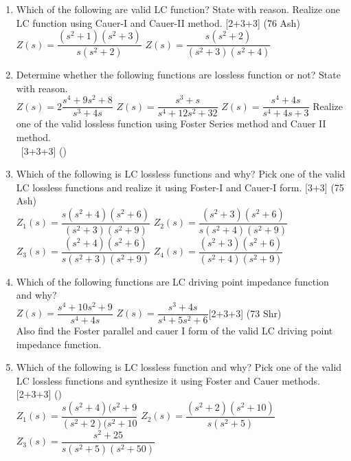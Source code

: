 \documentclass[12pt]{article}
\newcommand{\enter}{\\\textcolor{white}{1}}
\begin{document}
\begin{enumerate}
				\item Which of the following are valid LC function? State with reason. Realize one LC function using Cauer-I and Cauer-II method. \hfill [2+3+3] (76 Ash)\\
				$Z(s) = \dfrac{(s^2+1)(s^2+3)}{s(s^2+2)}$ \hspace{2cm}
				$Z(s) = \dfrac{s(s^2+2)}{(s^2+3)(s^2+4)}$
				
				\item Determine whether the following functions are lossless function or not? State with reason. \\
				$Z(s) = 2\dfrac{s^4+9s^2+8}{s^3+4s}$ \hspace{2cm}
				$Z(s) = \dfrac{s^3+s}{s^4+12s^2+32}$ \hspace{2cm}
				$Z(s) = \dfrac{s^4+4s}{s^4+4s+3}$
				Realize one of the valid lossless function using Foster Series method and Cauer II method.
				\enter\hfill [3+3+3] ()
				
				\item Which of the following is LC lossless functions and why? Pick one of the valid LC lossless functions and realize it using Foster-I and Cauer-I form. \hfill [3+3] (75 Ash)\\
				$Z_1(s) = \dfrac{s(s^2+4)(s^2+6)}{(s^2+3)(s^2+9)}$ \hspace{2cm}
				$Z_2(s) = \dfrac{(s^2+3)(s^2+6)}{s(s^2+4)(s^2+9)}$ \\
				$Z_3(s) = \dfrac{(s^2+4)(s^2+6)}{s(s^2+3)(s^2+9)}$ \hspace{2cm}
				$Z_4(s) = \dfrac{(s^2+3)(s^2+6)}{(s^2+4)(s^2+9)}$
				
				\item Which of the following functions are LC driving point impedance function and why?\\
				$Z(s) = \dfrac{s^4+10s^2+9}{s^4+4s}$ \hspace{2cm}
				$Z(s) = \dfrac{s^3+4s}{s^4+5s^2+6}$\hfill [2+3+3] (73 Shr)\\
				Also find the Foster parallel and cauer I form of the valid LC driving point impedance function.
				
				\item Which of the following is LC lossless function and why? Pick one of the valid LC lossless functions and synthesize it using Foster and Cauer methods. \hfill [2+3+3] ()\\
				$Z_1(s)=\dfrac{s(s^2+4)(s^2+9}{(s^2+2)(s^2+10}$ \hspace{2cm}
				$Z_2(s)=\dfrac{(s^2+2)(s^2+10)}{s(s^2+5)}$ \hspace{2cm}
				$Z_3(s)=\dfrac{s^2+25}{s(s^2+5)(s^2+50)}$
				

\end{enumerate}
\end{document}

